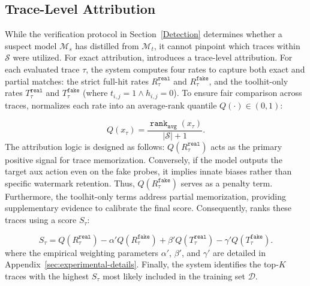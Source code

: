 \subsection{Trace-Level Attribution} \label{subsec:trace_level}

While the verification protocol in Section~\ref{Detection} determines whether a suspect model $\mathcal{M}_s$ has distilled from $\mathcal{M}_t$, it cannot pinpoint which traces within $\mathcal{S}$ were utilized. For exact attribution, \name{} introduces a trace-level attribution. For each evaluated trace $\tau$, the system computes four rates to capture both exact and partial matches: the strict full-hit rates $R_\tau^{\mathtt{real}}$ and $R_\tau^{\mathtt{fake}}$, and the toolhit-only rates $T_\tau^{\mathtt{real}}$ and $T_\tau^{\mathtt{fake}}$ (where $t_{i,j}=1 \land h_{i,j}=0$). To ensure fair comparison across traces, \name{} normalizes each rate into an average-rank quantile $Q(\cdot) \in (0, 1)$:

\begin{equation}
    Q(x_\tau) = \frac{\operatorname{\mathtt{rank}}_{\mathtt{avg}}(x_\tau)}{|\mathcal{S}| + 1}.
\end{equation}
The attribution logic is designed as follows: $Q(R_\tau^{\mathtt{real}})$ acts as the primary positive signal for trace memorization. Conversely, if the model outputs the target aux action even on the fake probes, it implies innate biases rather than specific watermark retention. Thus, $Q(R_\tau^{\mathtt{fake}})$ serves as a penalty term. Furthermore, the toolhit-only terms address partial memorization, providing supplementary evidence to calibrate the final score. Consequently, \name{} ranks these traces using a score $S_\tau$:
    
\begin{equation}
\!S_\tau\!=\!Q(R_\tau^{\mathtt{real}})
 \!-\!\alpha'Q(R_\tau^{\mathtt{fake}})
 \!+\!\beta'Q(T_\tau^{\mathtt{real}})
 \!-\!\gamma'Q(T_\tau^{\mathtt{fake}}).
\label{eq:trace-score}
\end{equation}
where the empirical weighting parameters $\alpha'$, $\beta'$, and $\gamma'$ are detailed in Appendix~\ref{sec:experimental-details}. Finally, the system identifies the top-$K$ traces with the highest $S_\tau$ most likely included in the training set $\mathcal{D}$.

